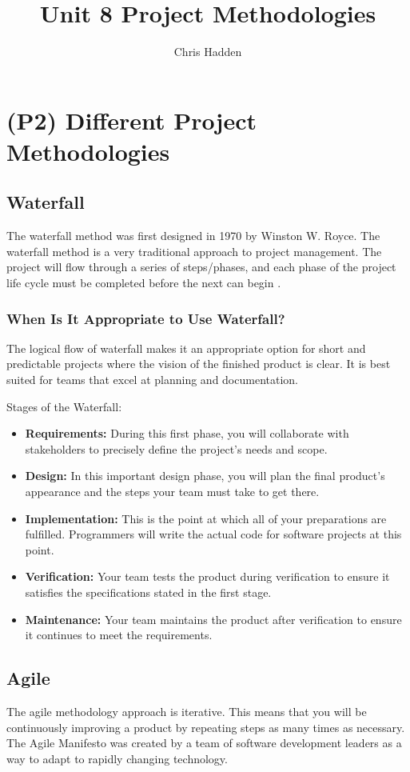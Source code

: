 \documentclass{article}
\title{Unit 8 Project Methodologies}
\author{Chris Hadden}
\date{}
\begin{document}
\maketitle

\section{(P2) Different Project Methodologies}
\subsection{Waterfall}
The waterfall method was first designed in 1970 by Winston W. Royce. The waterfall method is a very traditional approach to project management. The project will flow through a series of steps/phases, and each phase of the project life cycle must be completed before the next can begin \cite{waterfallref, royce}.

\subsubsection{When Is It Appropriate to Use Waterfall?}
The logical flow of waterfall makes it an appropriate option for short and predictable projects where the vision of the finished product is clear. It is best suited for teams that excel at planning and documentation.

Stages of the Waterfall:
\begin{itemize}
    \item \textbf{Requirements:} During this first phase, you will collaborate with stakeholders to precisely define the project's needs and scope.
    \item \textbf{Design:} In this important design phase, you will plan the final product's appearance and the steps your team must take to get there.
    \item \textbf{Implementation:} This is the point at which all of your preparations are fulfilled. Programmers will write the actual code for software projects at this point.
    \item \textbf{Verification:} Your team tests the product during verification to ensure it satisfies the specifications stated in the first stage.
    \item \textbf{Maintenance:} Your team maintains the product after verification to ensure it continues to meet the requirements.
\end{itemize}

\subsection{Agile}
The agile methodology approach is iterative. This means that you will be continuously improving a product by repeating steps as many times as necessary. The Agile Manifesto was created by a team of software development leaders as a way to adapt to rapidly changing technology.
\end{document}
